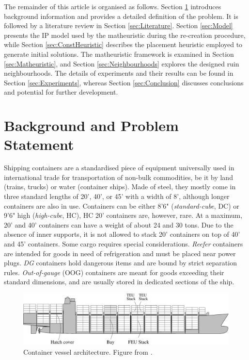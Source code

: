 \documentclass[preprint,12pt,3p]{elsarticle}
\begin{document}
The remainder of this article is organised as follows. Section \ref{sec:Background} introduces background information and provides a detailed definition of the problem. It is followed by a literature review in Section \ref{sec:Literature}. Section \ref{sec:Model} presents the IP model used by the matheuristic during the re-creation procedure, while Section \ref{sec:ConstHeuristic} describes the placement heuristic employed to generate initial solutions. The matheuristic framework is examined in Section \ref{sec:Matheuristic}, and Section \ref{sec:Neighbourhoods} explores the designed ruin neighbourhoods. The details of experiments and their results can be found in Section \ref{sec:Experiments}, whereas Section \ref{sec:Conclusion} discusses conclusions and potential for further development.

\section{Background and Problem Statement}
\label{sec:Background}
Shipping containers are a standardised piece of equipment universally used in international trade for transportation of non-bulk commodities, be it by land (trains, trucks) or water (container ships). Made of steel, they mostly come in three standard lengths of 20', 40', or 45' with a width of 8', although longer containers are also in use. Containers can be either 8'6" (\textit{standard-cube}, DC) or 9'6" high (\textit{high-cube}, HC), HC 20' containers are, however, rare. At a maximum, 20' and 40' containers can have a weight of about 24 and 30 tons. Due to the absence of inner supports, it is not allowed to stack 20' containers on top of 40' and 45' containers. Some cargo requires special considerations. \textit{Reefer} containers are intended for goods in need of refrigeration and must be placed near power plugs. \textit{DG} containers hold dangerous items and are bound by strict separation rules. \textit{Out-of-gauge} (OOG) containers are meant for goods exceeding their standard dimensions, and are usually stored in dedicated sections of the ship.

\begin{figure}[ht]
\centering
\includegraphics[width=1.0\linewidth]{Figures/vessel.eps}
\caption{Container vessel architecture. Figure from \cite{DJJRA12}.}
\label{fig:vessel}
\end{figure}
\end{document}
